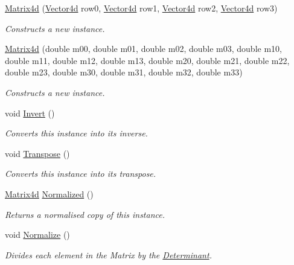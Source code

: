 \begin{DoxyCompactItemize}
\item 
\hyperlink{struct_open_t_k_1_1_matrix4d_a5f7953454cc9df27867df62c3a499f07}{Matrix4d} (\hyperlink{struct_open_t_k_1_1_vector4d}{Vector4d} row0, \hyperlink{struct_open_t_k_1_1_vector4d}{Vector4d} row1, \hyperlink{struct_open_t_k_1_1_vector4d}{Vector4d} row2, \hyperlink{struct_open_t_k_1_1_vector4d}{Vector4d} row3)
\begin{DoxyCompactList}\small\item\em Constructs a new instance. \end{DoxyCompactList}\item 
\hyperlink{struct_open_t_k_1_1_matrix4d_a7342c87b23b6af2b8bca0fbdbcb6ca6e}{Matrix4d} (double m00, double m01, double m02, double m03, double m10, double m11, double m12, double m13, double m20, double m21, double m22, double m23, double m30, double m31, double m32, double m33)
\begin{DoxyCompactList}\small\item\em Constructs a new instance. \end{DoxyCompactList}\item 
void \hyperlink{struct_open_t_k_1_1_matrix4d_aa53d2e9505286fdcab3caa5c1057ad2d}{Invert} ()
\begin{DoxyCompactList}\small\item\em Converts this instance into its inverse. \end{DoxyCompactList}\item 
void \hyperlink{struct_open_t_k_1_1_matrix4d_acf28f523e79a6eb1897350a69f2fb921}{Transpose} ()
\begin{DoxyCompactList}\small\item\em Converts this instance into its transpose. \end{DoxyCompactList}\item 
\hyperlink{struct_open_t_k_1_1_matrix4d}{Matrix4d} \hyperlink{struct_open_t_k_1_1_matrix4d_a2959912fa747974063aac3ee084c4b1d}{Normalized} ()
\begin{DoxyCompactList}\small\item\em Returns a normalised copy of this instance. \end{DoxyCompactList}\item 
void \hyperlink{struct_open_t_k_1_1_matrix4d_a7119933a5b5979963f58347cd0881227}{Normalize} ()
\begin{DoxyCompactList}\small\item\em Divides each element in the Matrix by the \hyperlink{struct_open_t_k_1_1_matrix4d_adf0dd00b8e2c98dc1d710144d831baba}{Determinant}. \end{DoxyCompactList}\item 

\end{DoxyCompactItemize}
